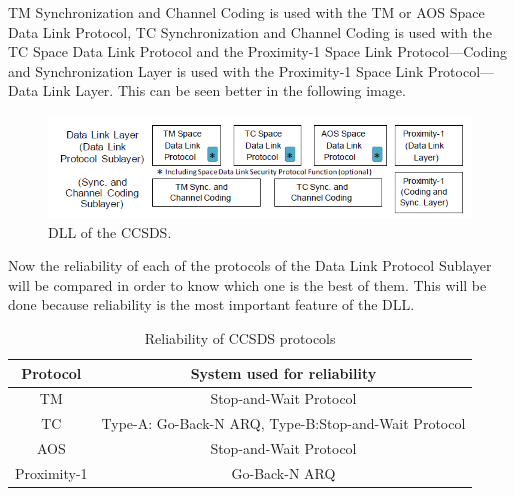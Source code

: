 TM Synchronization and Channel Coding is used with the TM or AOS Space Data Link
Protocol, TC Synchronization and Channel Coding is used with the TC Space Data Link Protocol and the Proximity-1 Space Link Protocol—Coding and Synchronization Layer is
used with the Proximity-1 Space Link Protocol—Data Link Layer. This can be seen better in the following image.

\begin{figure}[H]
\begin{center}
\includegraphics[scale=0.8]{DLLCCSDS.PNG}   
\caption{DLL of the CCSDS.}
\end{center}
\end{figure}

Now the reliability of each of the protocols of the Data Link Protocol Sublayer will be compared in order to know which one is the best of them. This will be done because reliability is the most important feature of the DLL.

\begin{table}[H]
\begin{center}
\begin{tabular}{|c|c|}
\hline
\textbf{Protocol}&\textbf{System used for reliability}\\
\hline
TM&Stop-and-Wait Protocol\\
\hline
TC&Type-A: Go-Back-N ARQ, Type-B:Stop-and-Wait Protocol\\
\hline
AOS&Stop-and-Wait Protocol\\
\hline
Proximity-1&Go-Back-N ARQ\\
\hline
\end{tabular}
\caption{Reliability of CCSDS protocols}
\end{center}
\end{table}

